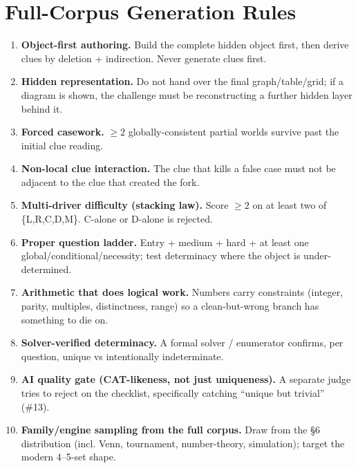 \documentclass[11pt,a4paper]{article}
\begin{document}
\section{Full-Corpus Generation Rules}
\begin{enumerate}[leftmargin=1.8em]
\item \textbf{Object-first authoring.} Build the complete hidden object first, then derive clues by deletion + indirection. Never generate clues first.
\item \textbf{Hidden representation.} Do not hand over the final graph/table/grid; if a diagram is shown, the challenge must be reconstructing a further hidden layer behind it.
\item \textbf{Forced casework.} $\ge2$ globally-consistent partial worlds survive past the initial clue reading.
\item \textbf{Non-local clue interaction.} The clue that kills a false case must not be adjacent to the clue that created the fork.
\item \textbf{Multi-driver difficulty (stacking law).} Score $\ge2$ on at least two of \{L,R,C,D,M\}. C-alone or D-alone is rejected.
\item \textbf{Proper question ladder.} Entry + medium + hard + at least one global/conditional/necessity; test determinacy where the object is under-determined.
\item \textbf{Arithmetic that does logical work.} Numbers carry constraints (integer, parity, multiples, distinctness, range) so a clean-but-wrong branch has something to die on.
\item \textbf{Solver-verified determinacy.} A formal solver / enumerator confirms, per question, unique vs intentionally indeterminate.
\item \textbf{AI quality gate (CAT-likeness, not just uniqueness).} A separate judge tries to reject on the checklist, specifically catching ``unique but trivial'' (\#13).
\item \textbf{Family/engine sampling from the full corpus.} Draw from the \S6 distribution (incl. Venn, tournament, number-theory, simulation); target the modern 4--5-set shape.
\end{enumerate}

\end{document}
